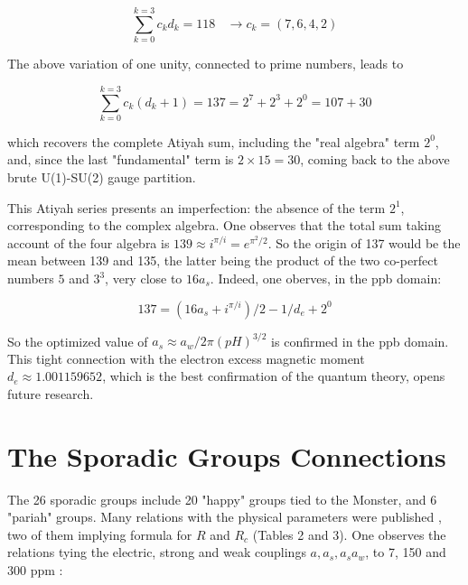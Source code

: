 \documentclass[a4paper,9pt]{article}
\newcounter{row}
\begin{document}
\begin{equation}\label{Eq49}
 \sum_{k=0}^{k=3} c_k d_k = 118 ~~~~ \rightarrow   c_k = (7,6,4,2)
 \end{equation}

The above variation of one unity, connected to prime numbers, leads to

\begin{equation}\label{Eq50}
 \sum_{k=0}^{k=3} c_k (d_k + 1) = 137 = 2^7 + 2^3 + 2^0 = 107 + 30
 \end{equation}

which recovers the complete Atiyah sum, including the "real algebra" term $2^0$, and, since the last "fundamental" term is $2\times 15 = 30$, coming back to the above brute U(1)-SU(2) gauge partition.

This Atiyah series presents an imperfection: the absence of the term $2^1$, corresponding to the complex algebra. One observes that the total sum taking account of the four algebra is $139 \approx i^{\pi/i} = e^{\pi^2/2}$. So the origin of 137 would be the mean between 139 and 135, the latter being the product of the two co-perfect numbers $5$ and $3^3$, very close to $16a_s$. Indeed, one oberves, in the ppb domain:

 \begin{equation}\label{Eq51}
 137 = (16a_s + i^{\pi/i})/2 - 1/d_e + 2^0
 \end{equation}

So the optimized value of $a_s\approx a_w/2\pi (pH)^{3/2}$ is confirmed in the ppb domain. This tight connection with the electron excess magnetic moment $d_e \approx 1.001159652$, which is the best confirmation of the quantum theory, opens future research.




\section{The Sporadic Groups Connections} 

The 26 sporadic groups include 20 "happy" groups tied to the Monster, and 6 "pariah" groups. Many relations with the physical parameters were published \cite{Sanchez3}, two of them implying formula for $R$ and $R_c$ (Tables 2 and 3). One observes the relations tying the electric, strong and weak couplings $a, a_s,a_s a_w$, to 7, 150 and 300 ppm  : 



\end{document}
